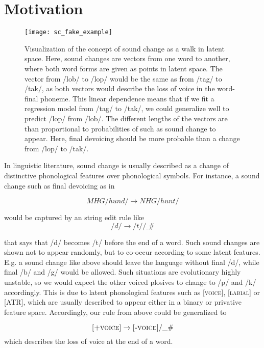 \documentclass[6pt]{article}
\begin{document}
\section{Motivation}
\label{Motivation}
\begin{figure}[h]
\begin{center}
\texttt{[image: sc\_fake\_example]} 
\caption{Visualization of the concept of sound change as a walk in latent space. Here, sound changes are vectors from one word to another, where both word forms are given as points in latent space. The vector from /lob/ to /lop/ would be the same as from /tag/ to /tak/, as both vectors would describe the loss of voice in the word-final phoneme. This linear dependence means that if we fit a regression model from /tag/ to /tak/, we could generalize well to predict /lop/ from /lob/. The different lengths of the vectors are than proportional to probabilities of such as sound change to appear. Here, final devoicing should be more probable than a change from /lop/ to /tak/. }
\label{fig:final_devoicing}
\end{center}
\end{figure}
In linguistic literature, sound change is usually described as a change of distinctive phonological features over phonological symbols. For instance, a sound change such as final devoicing as in 

\begin{equation}
MHG /hund/ \rightarrow NHG /hunt/
\end{equation}

 would be captured by an string edit rule like
\begin{equation}
/d/ \rightarrow /t/ / \_ \#
\end{equation}

that says that /d/ becomes /t/ before the end of a word. Such sound changes are shown not to appear randomly, but to co-occur according to some latent features. E.g. a sound change like above should leave the language without final /d/, while final /b/ and /g/ would be allowed. Such situations are evolutionary highly unstable, so we would expect the other voiced plosives to change to /p/ and /k/ accordingly. This is due to latent phonological features such as \textsc{[voice]}, \textsc{[labial]} or \textsc{[ATR]}, which are usually described to appear either in a binary or privative feature space. Accordingly, our rule from above could be generalized to

\begin{equation}
\textsc{[+voice]} \rightarrow \textsc{[-voice]} / \_ \#
\label{eq:final_devoicing}
\end{equation}
which describes the loss of voice at the end of a word. 
\end{document}
